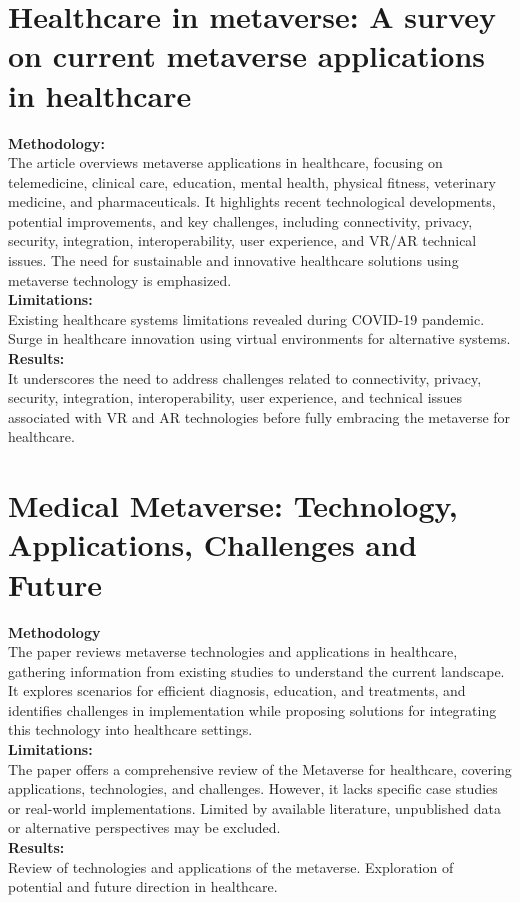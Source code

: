 \section{Healthcare in metaverse: A survey on current metaverse applications in healthcare\cite{bansal2022healthcare}\cite{JournalArticle12}}
\textbf{Methodology:}\\
The article overviews metaverse applications in healthcare, focusing on telemedicine, clinical care, education, mental health, physical fitness, veterinary medicine, and pharmaceuticals. It highlights recent technological developments, potential improvements, and key challenges, including connectivity, privacy, security, integration, interoperability, user experience, and VR/AR technical issues. The need for sustainable and innovative healthcare solutions using metaverse technology is emphasized.\\
\textbf{Limitations:}\\Existing healthcare systems limitations revealed during COVID-19 pandemic. Surge in healthcare innovation using virtual environments for alternative systems. \\
\textbf{Results:}\\It underscores the need to address challenges related to connectivity, privacy, security, integration, interoperability, user experience, and technical issues associated with VR and AR technologies before fully embracing the metaverse for healthcare.
\section{Medical Metaverse: Technology, Applications, Challenges and Future\cite{shao2023medical}}
\textbf{Methodology}\\The paper reviews metaverse technologies and applications in healthcare, gathering information from existing studies to understand the current landscape. It explores scenarios for efficient diagnosis, education, and treatments, and identifies challenges in implementation while proposing solutions for integrating this technology into healthcare settings.\\
\textbf{Limitations:}\\The paper offers a comprehensive review of the Metaverse for healthcare, covering applications, technologies, and challenges. However, it lacks specific case studies or real-world implementations. Limited by available literature, unpublished data or alternative perspectives may be excluded.\\
\textbf{Results:}\\ Review of technologies and applications of the metaverse. 
Exploration of potential and future direction in healthcare.
